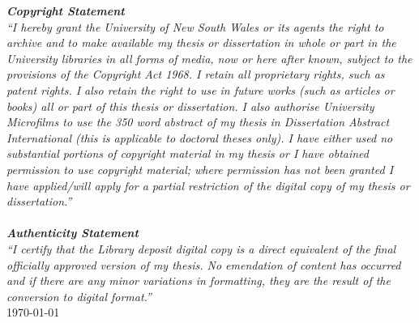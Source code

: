 \begin{center}
\begin{minipage}{0.75\textwidth}
  \vspace{4cm}
  \textit{
    \textbf{Copyright Statement}\\
    ``I hereby grant the University of New South Wales or its agents the right to archive and to make available my thesis or dissertation in whole or part in the University libraries in all forms of media, now or here after known, subject to the provisions of the Copyright Act 1968. I retain all proprietary rights, such as patent rights. I also retain the right to use in future works (such as articles or books) all or part of this thesis or dissertation.
    I also authorise University Microfilms to use the 350 word abstract of my thesis in Dissertation Abstract International (this is applicable to doctoral theses only).
  I have either used no substantial portions of copyright material in my thesis or I have obtained permission to use copyright material; where permission has not been granted I have applied/will apply for a partial restriction of the digital copy of my thesis or dissertation.''\\
  }
  \vspace{1.5cm}\\
  \textit{
    \textbf{Authenticity Statement}\\
    ``I certify that the Library deposit digital copy is a direct equivalent of the final officially approved version of my thesis. No emendation of content has occurred and if there are any minor variations in formatting, they are the result of the conversion to digital format.''
  }
  \vspace{3.5cm}\\
  \hspace*{1cm}\today
\end{minipage}
\end{center}
